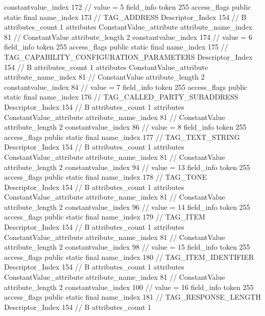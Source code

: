 {{{{{{{					constantvalue_index	172		// value = 5
				}
				}
			}
			field_info {
				token	255
				access_flags	public static final
				name_index	173		// TAG_ADDRESS
				Descriptor_Index	154		// B
				attributes_count	1
				attributes {
				ConstantValue_attribute {
					attribute_name_index	81		// ConstantValue
					attribute_length	2
					constantvalue_index	174		// value = 6
				}
				}
			}
			field_info {
				token	255
				access_flags	public static final
				name_index	175		// TAG_CAPABILITY_CONFIGURATION_PARAMETERS
				Descriptor_Index	154		// B
				attributes_count	1
				attributes {
				ConstantValue_attribute {
					attribute_name_index	81		// ConstantValue
					attribute_length	2
					constantvalue_index	84		// value = 7
				}
				}
			}
			field_info {
				token	255
				access_flags	public static final
				name_index	176		// TAG_CALLED_PARTY_SUBADDRESS
				Descriptor_Index	154		// B
				attributes_count	1
				attributes {
				ConstantValue_attribute {
					attribute_name_index	81		// ConstantValue
					attribute_length	2
					constantvalue_index	86		// value = 8
				}
				}
			}
			field_info {
				token	255
				access_flags	public static final
				name_index	177		// TAG_TEXT_STRING
				Descriptor_Index	154		// B
				attributes_count	1
				attributes {
				ConstantValue_attribute {
					attribute_name_index	81		// ConstantValue
					attribute_length	2
					constantvalue_index	94		// value = 13
				}
				}
			}
			field_info {
				token	255
				access_flags	public static final
				name_index	178		// TAG_TONE
				Descriptor_Index	154		// B
				attributes_count	1
				attributes {
				ConstantValue_attribute {
					attribute_name_index	81		// ConstantValue
					attribute_length	2
					constantvalue_index	96		// value = 14
				}
				}
			}
			field_info {
				token	255
				access_flags	public static final
				name_index	179		// TAG_ITEM
				Descriptor_Index	154		// B
				attributes_count	1
				attributes {
				ConstantValue_attribute {
					attribute_name_index	81		// ConstantValue
					attribute_length	2
					constantvalue_index	98		// value = 15
				}
				}
			}
			field_info {
				token	255
				access_flags	public static final
				name_index	180		// TAG_ITEM_IDENTIFIER
				Descriptor_Index	154		// B
				attributes_count	1
				attributes {
				ConstantValue_attribute {
					attribute_name_index	81		// ConstantValue
					attribute_length	2
					constantvalue_index	100		// value = 16
				}
				}
			}
			field_info {
				token	255
				access_flags	public static final
				name_index	181		// TAG_RESPONSE_LENGTH
				Descriptor_Index	154		// B
				attributes_count	1
}}}}}
